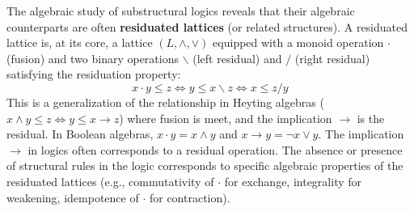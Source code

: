 The algebraic study of substructural logics reveals that their algebraic counterparts are often \textbf{residuated lattices} (or related structures).
A residuated lattice is, at its core, a lattice $(L, \land, \lor)$ equipped with a monoid operation $\cdot$ (fusion) and two binary operations $\backslash$ (left residual) and $/$ (right residual) satisfying the residuation property:
\[ x \cdot y \le z \iff y \le x \backslash z \iff x \le z / y \]
This is a generalization of the relationship in Heyting algebras ($x \land y \le z \iff y \le x \to z$) where fusion is meet, and the implication $\to$ is the residual. In Boolean algebras, $x \cdot y = x \land y$ and $x \to y = \neg x \lor y$. The implication $\to$ in logics often corresponds to a residual operation.
The absence or presence of structural rules in the logic corresponds to specific algebraic properties of the residuated lattices (e.g., commutativity of $\cdot$ for exchange, integrality for weakening, idempotence of $\cdot$ for contraction).